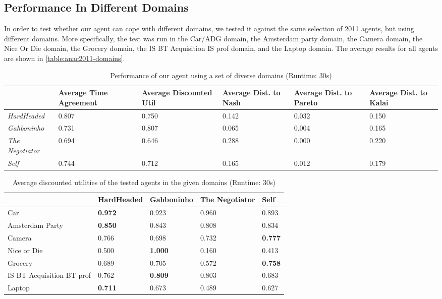 \subsection{Performance In Different Domains}
In order to test whether our agent can cope with different domains, we tested it against the same selection of 2011 agents, but using different domains. More specifically, the test was run in the Car/ADG domain, the Amsterdam party domain, the Camera domain, the Nice Or Die domain, the Grocery domain, the IS BT Acquisition IS prof domain, and the Laptop domain. The average results for all agents are shown in \autoref{table:anac2011-domains}.
\begin{table}[H]
  \centering
  \small
  \begin{tabular}{l|p{2cm}|p{2cm}|p{2cm}|p{2cm}|p{2cm}|}
    ~                     & Average Time Agreement & Average Discounted Util & Average Dist. to Nash & Average Dist. to Pareto & Average Dist. to Kalai \\
    \hline
    \emph{HardHeaded}     & 0.807 & 0.750 & 0.142 & 0.032 & 0.150 \\ \hline
    \emph{Gahboninho}     & 0.731 & 0.807 & 0.065 & 0.004 & 0.165 \\ \hline
    \emph{The Negotiator} & 0.694 & 0.646 & 0.288 & 0.000 & 0.220 \\ \hline
    \emph{Self}           & 0.744 & 0.712 & 0.165 & 0.012 & 0.179 \\ \hline
  \end{tabular}
 \caption{Performance of our agent using a set of diverse domains (Runtime: $30$s) \label{table:anac2011-domains}}
\end{table}

\begin{table}[H]
  \centering
  \small
  \begin{tabular}{l|p{2.5cm}|p{2.5cm}|p{2.5cm}|p{2.5cm}|}
			    & HardHeaded     & Gahboninho     & The Negotiator & Self \\ \hline
  Car                       & \textbf{0.972} & 0.923          & 0.960          & 0.893 \\ \hline
  Amsterdam Party           & \textbf{0.850} & 0.843          & 0.808          & 0.834 \\ \hline
  Camera                    & 0.766          & 0.698          & 0.732          & \textbf{0.777} \\ \hline
  Nice or Die               & 0.500          & \textbf{1.000} & 0.160          & 0.413 \\ \hline
  Grocery                   & 0.689          & 0.705          & 0.572          & \textbf{0.758} \\ \hline
  IS BT Acquisition BT prof & 0.762          & \textbf{0.809} & 0.803          & 0.683 \\ \hline
  Laptop                    & \textbf{0.711} & 0.673          & 0.489          & 0.627 \\ \hline
  \end{tabular}
  \caption{Average discounted utilities of the tested agents in the given domains (Runtime: $30$s) \label{table:anac2011-domains2}}
\end{table}

